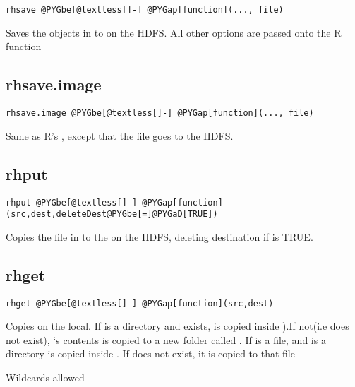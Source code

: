\documentclass[letterpaper,10pt,english]{manual}
\begin{document}
\begin{Verbatim}[commandchars=@\[\]]
rhsave @PYGbe[@textless[]-] @PYGap[function](..., file)
\end{Verbatim}

Saves the objects in  to  on the HDFS. All other options are
passed onto the R function 


\subsection{rhsave.image}

\begin{Verbatim}[commandchars=@\[\]]
rhsave.image @PYGbe[@textless[]-] @PYGap[function](..., file)
\end{Verbatim}

Same as R's , except that the file goes to the HDFS.


\subsection{rhput}

\begin{Verbatim}[commandchars=@\[\]]
rhput @PYGbe[@textless[]-] @PYGap[function](src,dest,deleteDest@PYGbe[=]@PYGaD[TRUE])
\end{Verbatim}

Copies the file in  to the  on the HDFS, deleting destination if
 is TRUE.


\subsection{rhget}

\begin{Verbatim}[commandchars=@\[\]]
rhget @PYGbe[@textless[]-] @PYGap[function](src,dest)
\end{Verbatim}

Copies  on the local. If  is a directory and  exists,
 is copied inside ).If not(i.e
 does not exist), `s contents is copied to a new folder called
.  If  is a file, and  is a directory  is copied
inside  . If  does not exist, it is copied to that file

Wildcards allowed
\end{document}
